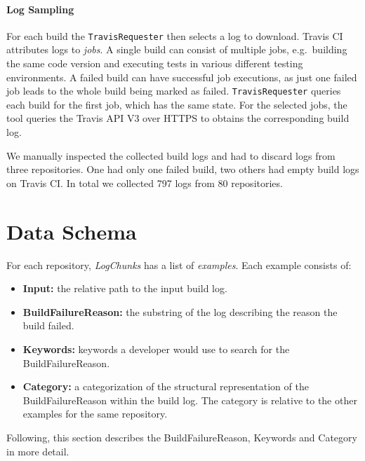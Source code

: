 \documentclass[\myrootdir/main.tex]{subfiles}
\begin{document}
\paragraph{Log Sampling}
For each build the \texttt{TravisRequester} then selects a log to download.
Travis CI attributes logs to \emph{jobs}.
A single build can consist of multiple jobs, e.g.\ building the same code version and executing tests in various different testing environments.
A failed build can have successful job executions, as just one failed job leads to the whole build being marked as failed.
\texttt{TravisRequester} queries each build for the first job, which has the same state.
For the selected jobs, the tool queries the Travis API V3 over HTTPS to obtains the corresponding build log.

We manually inspected the collected build logs and had to discard logs from three repositories.
One had only one failed build, two others had empty build logs on Travis CI\@.
In total we collected 797 logs from 80 repositories.

\section{Data Schema}
\label{sec:data-schema}
For each repository, \emph{LogChunks} has a list of \emph{examples}.
Each example consists of:
\begin{itemize}
	\item \textbf{Input:} the relative path to the input build log.
	\item \textbf{BuildFailureReason:} the substring of the log describing the reason the build failed.
	\item \textbf{Keywords:} keywords a developer would use to search for the BuildFailureReason.
	\item \textbf{Category:} a categorization of the structural representation of the BuildFailureReason within the build log.
				The category is relative to the other examples for the same repository.
\end{itemize}
Following, this section describes the BuildFailureReason, Keywords and Category in more detail.
\end{document}
